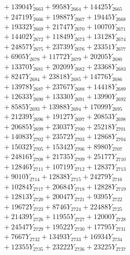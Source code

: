 \documentclass[a4paper,10pt]{article}
\begin{document}
{\begin{align}
&\;  + 13904 Y_{2663} + 9958 Y_{2664} + 14425 Y_{2665} \\[0.3ex]
&\;  + 24719 Y_{2666} + 19887 Y_{2667} + 19445 Y_{2668} \\[0.5ex]\allowbreak
&\;  + 19332 Y_{2669} + 21747 Y_{2670} + 10070 Y_{2671} \\[0.3ex]
&\;  + 14402 Y_{2672} + 11849 Y_{2673} + 13128 Y_{2674} \\[0.3ex]
&\;  + 24857 Y_{2675} + 23739 Y_{2676} + 23351 Y_{2677} \\[0.3ex]
&\;  + 6905 Y_{2678} + 11772 Y_{2679} + 20205 Y_{2680} \\[0.3ex]
&\;  + 13370 Y_{2681} + 20209 Y_{2682} + 23368 Y_{2683} \\[0.3ex]
&\;  + 8247 Y_{2684} + 23818 Y_{2685} + 14776 Y_{2686} \\[0.3ex]
&\;  + 13978 Y_{2687} + 23767 Y_{2688} + 14418 Y_{2689} \\[0.3ex]
&\;  + 12633 Y_{2690} + 13330 Y_{2691} + 13990 Y_{2692} \\[0.3ex]
&\;  + 8585 Y_{2693} + 13988 Y_{2694} + 17099 Y_{2695} \\[0.3ex]
&\;  + 21239 Y_{2696} + 19127 Y_{2697} + 20853 Y_{2698} \\[0.5ex]\allowbreak
&\;  + 20685 Y_{2699} + 23037 Y_{2700} + 25218 Y_{2701} \\[0.3ex]
&\;  + 14083 Y_{2702} + 23572 Y_{2703} + 12868 Y_{2704} \\[0.3ex]
&\;  + 15032 Y_{2705} + 15342 Y_{2706} + 8980 Y_{2707} \\[0.3ex]
&\;  + 24816 Y_{2708} + 21735 Y_{2709} + 25177 Y_{2710} \\[0.3ex]
&\;  + 12846 Y_{2711} + 10719 Y_{2712} + 12837 Y_{2713} \\[0.3ex]
&\;  + 9010 Y_{2714} + 12838 Y_{2715} + 24279 Y_{2716} \\[0.3ex]
&\;  + 10284 Y_{2717} + 20684 Y_{2718} + 12828 Y_{2719} \\[0.3ex]
&\;  + 12813 Y_{2720} + 20047 Y_{2721} + 9395 Y_{2722} \\[0.3ex]
&\;  + 19672 Y_{2723} + 8746 Y_{2724} + 22488 Y_{2725} \\[0.3ex]
&\;  + 21439 Y_{2726} + 11955 Y_{2727} + 12000 Y_{2728} \\[0.5ex]\allowbreak
&\;  + 24547 Y_{2729} + 19522 Y_{2730} + 17795 Y_{2731} \\[0.3ex]
&\;  + 7667 Y_{2732} + 13493 Y_{2733} + 16934 Y_{2734} \\[0.3ex]
&\;  + 12355 Y_{2735} + 23222 Y_{2736} + 23225 Y_{2737} \\[0.3ex]

\end{align}}
\end{document}

